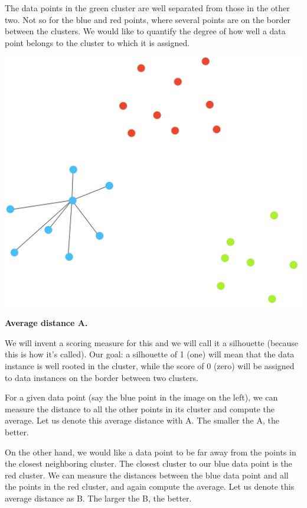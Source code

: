 The data points in the green cluster are well separated from those in the other two. Not so for the blue and red points, where several points are on the border between the clusters. We would like to quantify the degree of how well a data point belongs to the cluster to which it is assigned.

\begin{marginfigure}
    \centering
    \includegraphics[scale=0.25]{silhouette-pt1.png}
    \caption{\textbf{\textsf{Average distance A.}}}
\end{marginfigure}

We will invent a scoring measure for this and we will call it a silhouette (because this is how it's called). Our goal: a silhouette of 1 (one) will mean that the data instance is well rooted in the cluster, while the score of 0 (zero) will be assigned to data instances on the border between two clusters.

For a given data point (say the blue point in the image on the left), we can measure the distance to all the other points in its cluster and compute the average. Let us denote this average distance with A. The smaller the A, the better.

On the other hand, we would like a data point to be far away from the points in the closest neighboring cluster. The closest cluster to our blue data point is the red cluster. We can measure the distances between the blue data point and all the points in the red cluster, and again compute the average. Let us denote this average distance as B. The larger the B, the better.


